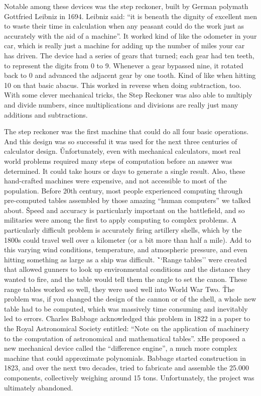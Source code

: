 Notable among these devices was the step reckoner, built by German polymath Gottfried Leibniz in 1694. Leibniz said:
``it is beneath the dignity of excellent men to waste their time in calculation when any peasant could do the work
just as accurately with the aid of a machine''. It worked kind of like the odometer in your car, which is really just
a machine for adding up the number of miles your car has driven. The device had a series of gears that turned; each
gear had ten teeth, to represent the digits from 0 to 9. Whenever a gear bypassed nine, it rotated back to 0 and
advanced the adjacent gear by one tooth. Kind of like when hitting 10 on that basic abacus. This worked in reverse
when doing subtraction, too. With some clever mechanical tricks, the Step Reckoner was also able to multiply and
divide numbers, since multiplications and divisions are really just many additions and subtractions.


The step reckoner was the first machine that could do all four basic operations. And this design was so successful it
was used for the next three centuries of calculator design. \v

Unfortunately, even with mechanical calculators, most real world problems required many steps of computation before
an answer was determined. It could take hours or days to generate a single result. Also, these hand-crafted machines
were expensive, and not accessible to most of the population. Before 20th century, most people experienced computing
through pre-computed tables assembled by those amazing ``human computers'' we talked about. \v

Speed and accuracy is particularly important on the battlefield, and so militaries were among the first to apply
computing to complex problems. A particularly difficult problem is accurately firing artillery shells, which by the
1800s could travel well over a kilometer (or a bit more than half a mile). Add to this varying wind conditions,
temperature, and atmospheric pressure, and even hitting something as large as a ship was difficult. \v

``Range tables'' were created that allowed gunners to look up environmental conditions and the distance they wanted to
fire, and the table would tell them the angle to set the canon. These range tables worked so well, they were used
well into World War Two. \v

The problem was, if you changed the design of the cannon or of the shell, a whole new table had to be computed, which
was massively time consuming and inevitably led to errors. Charles Babbage acknowledged this problem in 1822 in a
paper to the Royal Astronomical Society entitled: ``Note on the application of machinery to the computation of
astronomical and mathematical tables''. xHe proposed a new mechanical device called the ``difference engine'', a much
more complex machine that could approximate polynomials. Babbage started construction in 1823, and over the next two
decades, tried to fabricate and assemble the 25.000 components, collectively weighing around 15 tons. Unfortunately,
the project was ultimately abandoned.

